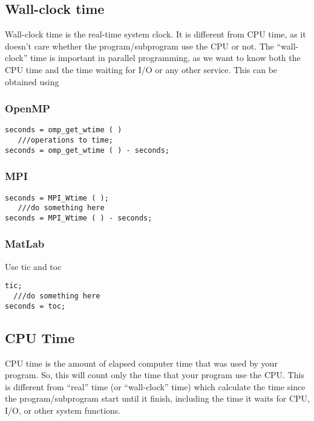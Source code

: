 \subsection{Wall-clock time}
\label{sec:wall-clock-time}


Wall-clock time is the real-time system clock. It is different from
CPU time, as it doesn't care whether the program/subprogram use the
CPU or not. The ``wall-clock'' time is important in parallel
programming, as we want to know both the CPU time and the time waiting
for I/O or any other service. This can be obtained using

\subsubsection{OpenMP}
\label{sec:openmp-2}


\begin{lstlisting}
seconds = omp_get_wtime ( )
   ///operations to time;
seconds = omp_get_wtime ( ) - seconds;
\end{lstlisting}


\subsubsection{MPI}
\label{sec:mpi-2}


\begin{lstlisting}
seconds = MPI_Wtime ( );
   ///do something here
seconds = MPI_Wtime ( ) - seconds;
\end{lstlisting}

\subsubsection{MatLab}
\label{sec:matlab}

Use tic and toc
\begin{verbatim}
tic;
  ///do something here
seconds = toc;
\end{verbatim}



\subsection{CPU Time}
\label{sec:cpu-time}

CPU time is the amount of elapsed computer time that was used by your
program. So, this will count only the time that your program use the
CPU. This is different from ``real'' time (or ``wall-clock'' time)
which calculate the time since the program/subprogram start until it
finish, including the time it waits for CPU, I/O, or other system
functions. 

